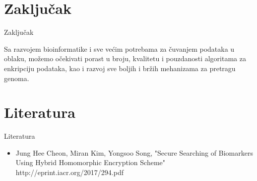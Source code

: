 \documentclass[10pt]{beamer}
\begin{document}
\section{Zaključak}
\begin{frame}{Zaključak}
	\begin{block}{}
	Sa razvojem bioinformatike i sve većim potrebama za čuvanjem podataka u oblaku, možemo očekivati porast u broju, kvalitetu i pouzdanosti algoritama za enkripciju podataka, kao i razvoj sve boljih i bržih mehanizama za pretragu genoma.
	\end{block}
\end{frame}


  

\section{Literatura}
\begin{frame}{Literatura}
\begin{itemize}
\item Jung Hee Cheon, Miran Kim, Yongsoo Song, "Secure Searching of Biomarkers Using Hybrid Homomorphic Encryption Scheme"\\ http://eprint.iacr.org/2017/294.pdf
\end{itemize}

\end{frame}


{\1
\begin{frame}
\end{frame}}
\end{document}
